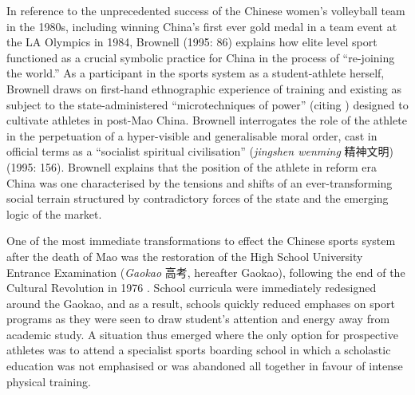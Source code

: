 \begin{CJK}{UTF8}{gbsn}
In reference to the unprecedented success of the Chinese women’s volleyball team in the 1980s, including winning China's first ever gold medal in a team event at the LA Olympics in 1984, Brownell (1995: 86) explains how elite level sport functioned as a crucial symbolic practice for China in the process of ``re-joining the world.''  As a participant in the sports system as a student-athlete herself, Brownell draws on first-hand ethnographic experience of training and existing as subject to the state-administered ``microtechniques of power'' (citing \cite{Foucault1977}) designed to cultivate athletes in post-Mao China.  Brownell interrogates the role of the athlete in the perpetuation of a hyper-visible and generalisable moral order, cast in official terms as a ``socialist spiritual civilisation'' (\textit{jingshen wenming} 精神文明) (1995: 156).  Brownell explains that the position of the athlete in reform era China was one characterised by the tensions and shifts of an ever-transforming social terrain structured by contradictory forces of the state and the emerging logic of the market.

One of the most immediate transformations to effect the Chinese sports system after the death of Mao was the restoration of the High School University Entrance Examination (\textit{Gaokao} 高考, hereafter Gaokao), following the end of the Cultural Revolution in 1976 \citep[198]{Brownell1995}.  School curricula were immediately redesigned around the Gaokao, and as a result, schools quickly reduced emphases on sport programs as they were seen to draw student’s attention and energy away from academic study.  A situation thus emerged where the only option for prospective athletes was to attend a specialist sports boarding school in which a scholastic education was not emphasised or was abandoned all together in favour of intense physical training.


\end{CJK}

